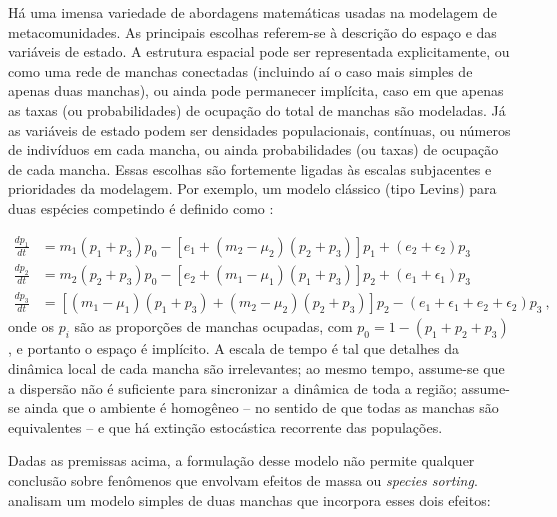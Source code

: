 \documentclass[12pt]{extarticle}
\begin{document}
Há uma imensa variedade de abordagens matemáticas usadas na modelagem de
metacomunidades. As principais escolhas referem-se à descrição do espaço e das
variáveis de estado. A estrutura espacial pode ser representada
explicitamente, ou como uma rede de manchas conectadas (incluindo aí o caso
mais simples de apenas duas manchas), ou ainda pode permanecer implícita, caso
em que apenas as taxas (ou probabilidades) de ocupação do total de manchas são
modeladas. Já as variáveis de estado podem ser densidades populacionais,
contínuas, ou números de indivíduos em cada mancha, ou ainda probabilidades
(ou taxas) de ocupação de cada mancha.
Essas escolhas são fortemente ligadas às
escalas subjacentes e prioridades da modelagem. Por exemplo, um
modelo clássico (tipo Levins) para duas espécies competindo é definido como
\citep{slatkin1974}:

\begin{equation}
  \begin{aligned}
    \frac{dp_1}{dt} &= m_1 (p_1+p_3) p_0 - \left[ e_1 + (m_2-\mu_2)(p_2+p_3) \right] p_1 + (e_2+\epsilon_2)p_3\\
    \frac{dp_2}{dt} &= m_2 (p_2+p_3) p_0 - \left[ e_2 + (m_1-\mu_1)(p_1+p_3) \right] p_2 + (e_1+\epsilon_1)p_3\\
    \frac{dp_3}{dt} &= \left[ (m_1-\mu_1)(p_1+p_3) + (m_2-\mu_2)(p_2+p_3)\right] p_2 -
    (e_1+\epsilon_1+e_2+\epsilon_2)p_3~,
  \end{aligned}
\end{equation}
% 
onde os $p_i$ são as proporções de manchas ocupadas, com $p_0 =
1-(p_1+p_2+p_3)$, e portanto o espaço é implícito. A escala de tempo é tal que detalhes da dinâmica local de cada mancha
são irrelevantes; ao mesmo tempo, assume-se que a dispersão não é suficiente para
sincronizar a dinâmica de toda a região; assume-se ainda que o ambiente é
homogêneo -- no sentido de que todas as manchas são equivalentes -- e que há
extinção estocástica recorrente das populações.

Dadas as premissas acima, a formulação desse modelo não permite
qualquer conclusão sobre fenômenos que envolvam efeitos de massa ou \emph{species sorting}. 
\citet{amarasekare2001} analisam um modelo simples de duas
manchas que incorpora esses dois efeitos:
\end{document}
